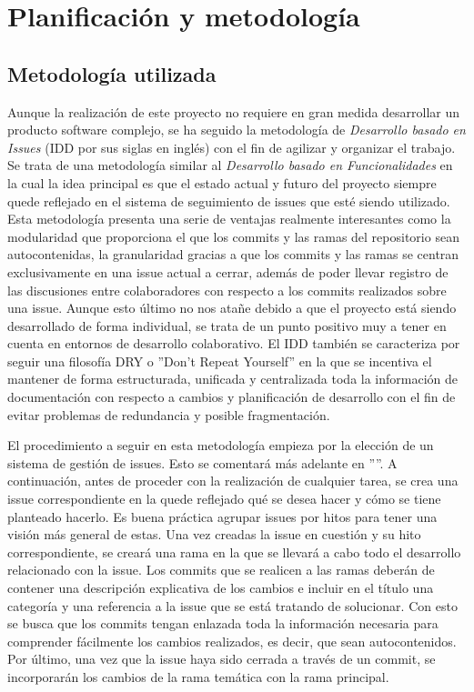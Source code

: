 \chapter{Planificación y metodología}
\label{planificacion}

\section{Metodología utilizada}
\label{metodologia}
Aunque la realización de este proyecto no requiere en gran medida desarrollar un producto software complejo, 
se ha seguido la metodología de \textit{Desarrollo basado en Issues} (IDD por sus siglas en inglés) con el fin de agilizar y organizar el trabajo.
Se trata de una metodología similar al \textit{Desarrollo basado en Funcionalidades} en la cual la idea principal es que el 
estado actual y futuro del proyecto siempre quede reflejado en el sistema de seguimiento de issues que esté siendo utilizado.
Esta metodología presenta una serie de ventajas realmente interesantes como la modularidad que proporciona el que 
los commits y las ramas del repositorio sean autocontenidas, la granularidad gracias a que los commits y las ramas 
se centran exclusivamente en una issue actual a cerrar, además de poder llevar registro de las discusiones entre 
colaboradores con respecto a los commits realizados sobre una issue. Aunque esto último no nos atañe debido a que 
el proyecto está siendo desarrollado de forma individual, se trata de un punto positivo muy a tener en cuenta en 
entornos de desarrollo colaborativo.
El IDD también se caracteriza por seguir una filosofía DRY o ''Don't Repeat Yourself'' en 
la que se incentiva el mantener de forma estructurada, unificada y centralizada toda la información de documentación 
con respecto a cambios y planificación de desarrollo con el fin de evitar problemas de redundancia y posible
fragmentación.\bigskip

El procedimiento a seguir en esta metodología empieza por la elección de un sistema de gestión de issues. Esto se 
comentará más adelante en ''''. A continuación, antes de proceder con la realización de 
cualquier tarea, se crea una issue correspondiente en la quede reflejado qué se desea hacer y cómo se tiene planteado 
hacerlo. Es buena práctica agrupar issues por hitos para tener una visión más general de estas. Una vez 
creadas la issue en cuestión y su hito correspondiente, se creará una rama en la que se llevará a cabo todo el 
desarrollo relacionado con la issue. Los commits que se realicen a las ramas deberán de contener una descripción 
explicativa de los cambios e incluir en el título una categoría y una referencia a la issue que se está tratando de solucionar. Con 
esto se busca que los commits tengan enlazada toda la información necesaria para comprender fácilmente los cambios 
realizados, es decir, que sean autocontenidos. Por último, una vez que la issue haya sido cerrada a través de un 
commit, se incorporarán los cambios de la rama temática con la rama principal.

